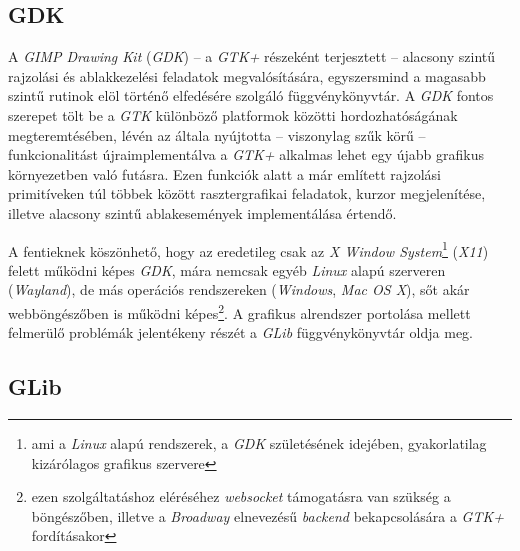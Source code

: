 \subsection{GDK}
\label{sec:gdk}

A \textit{GIMP Drawing Kit} (\textit{GDK}) -- a \textit{GTK+} részeként terjesztett -- alacsony szintű rajzolási és ablakkezelési feladatok megvalósítására, egyszersmind a magasabb szintű rutinok elöl történő elfedésére szolgáló függvénykönyvtár. A \textit{GDK }fontos szerepet tölt be a \textit{GTK} különböző platformok közötti hordozhatóságának megteremtésében, lévén az általa nyújtotta -- viszonylag szűk körű -- funkcionalitást újraimplementálva a \textit{GTK+} alkalmas lehet egy újabb grafikus környezetben való futásra. Ezen funkciók alatt a már említett rajzolási primitíveken túl többek között rasztergrafikai feladatok, kurzor megjelenítése, illetve alacsony szintű ablakesemények implementálása értendő.

A fentieknek köszönhető, hogy az eredetileg csak az \textit{X Window System}\footnote{ami a \textit{Linux} alapú rendszerek, a \textit{GDK} születésének idejében, gyakorlatilag kizárólagos grafikus szervere} (\textit{X11}) felett működni képes \textit{GDK}, mára nemcsak egyéb \textit{Linux} alapú szerveren (\textit{Wayland}), de más operációs rendszereken (\textit{Windows}, \textit{Mac OS X}), sőt akár webböngészőben is működni képes\footnote{ezen szolgáltatáshoz eléréséhez \textit{websocket} támogatásra van szükség a böngészőben, illetve a \textit{Broadway} elnevezésű \textit{backend} bekapcsolására a \textit{GTK+} fordításakor}. A grafikus alrendszer portolása mellett felmerülő problémák jelentékeny részét a \textit{GLib} függvénykönyvtár oldja meg.

\subsection{GLib}

